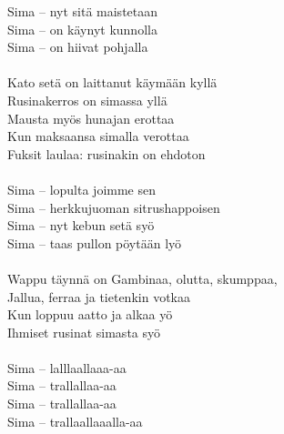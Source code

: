             Sima – nyt sitä maistetaan \\
            Sima – on käynyt kunnolla \\
            Sima – on hiivat pohjalla \\
\hspace{10mm} \\
            Kato setä on laittanut käymään kyllä \\
            Rusinakerros on simassa yllä \\
            Mausta myös hunajan erottaa \\
            Kun maksaansa simalla verottaa \\
            Fuksit laulaa: rusinakin on ehdoton \\
\hspace{10mm} \\
            Sima – lopulta joimme sen \\
            Sima – herkkujuoman sitrushappoisen \\
            Sima – nyt kebun setä syö \\
            Sima – taas pullon pöytään lyö \\
\hspace{10mm} \\
            Wappu täynnä on Gambinaa, olutta, skumppaa, \\
            Jallua, ferraa ja tietenkin votkaa \\
            Kun loppuu aatto ja alkaa yö \\
            Ihmiset rusinat simasta syö \\
\hspace{10mm} \\
            Sima – lalllaallaaa-aa \\
            Sima – trallallaa-aa \\
            Sima – trallallaa-aa \\
            Sima – trallaallaaalla-aa \\
